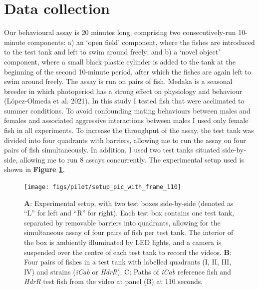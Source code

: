 \documentclass[
]{book}
\begin{document}
\hypertarget{pilot-data-collection}{%
\section{Data collection}\label{pilot-data-collection}}

Our behavioural assay is 20 minutes long, comprising two consecutively-run 10-minute components: a) an `open field' component, where the fishes are introduced to the test tank and left to swim around freely; and b) a `novel object' component, where a small black plastic cylinder is added to the tank at the beginning of the second 10-minute period, after which the fishes are again left to swim around freely. The assay is run on pairs of fish. Medaka is a seasonal breeder in which photoperiod has a strong effect on physiology and behaviour (López-Olmeda et al. 2021). In this study I tested fish that were acclimated to summer conditions. To avoid confounding mating behaviours between males and females and associated aggressive interactions between males I used only female fish in all experiments. To increase the throughput of the assay, the test tank was divided into four quadrants with barriers, allowing me to run the assay on four pairs of fish simultaneously. In addition, I used two test tanks situated side-by-side, allowing me to run 8 assays concurrently. The experimental setup used is shown in \textbf{Figure \ref{fig:assay-setup}}.



\begin{figure}
\texttt{[image: figs/pilot/setup\_pic\_with\_frame\_110]} \caption{\textbf{A}: Experimental setup, with two test boxes side-by-side (denoted as ``L'' for left and ``R'' for right). Each test box contains one test tank, separated by removable barriers into quadrants, allowing for the simultaneous assay of four pairs of fish per test tank. The interior of the box is ambiently illuminated by LED lights, and a camera is suspended over the centre of each test tank to record the videos. \textbf{B}: Four pairs of fishes in a test tank with labelled quadrants (I, II, III, IV) and strains (\emph{iCab} or \emph{HdrR}). C: Paths of \emph{iCab} reference fish and \emph{HdrR} test fish from the video at panel (B) at 110 seconds.}\label{fig:assay-setup}
\end{figure}
\end{document}
